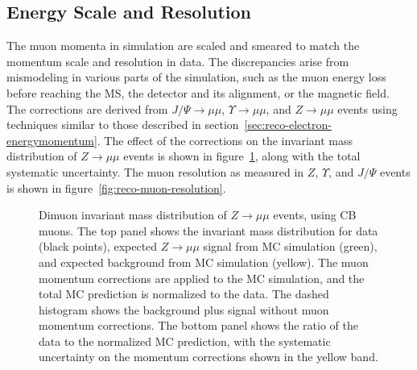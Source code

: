 \subsection{Energy Scale and Resolution}\label{sec:reco-muon-energymomentum}
The muon momenta in simulation are scaled and smeared to match the momentum scale and resolution in data. The discrepancies arise from mismodeling in various parts of the simulation, such as the muon energy loss before reaching the MS, the detector and its alignment, or the magnetic field. The corrections are derived from $J/\Psi\rightarrow\mu\mu$, $\Upsilon\rightarrow\mu\mu$, and $Z\rightarrow\mu\mu$ events using techniques similar to those described in section~\ref{sec:reco-electron-energymomentum}. The effect of the corrections on the invariant mass distribution of $Z\rightarrow\mu\mu$ events is shown in figure~\ref{fig:reco-muon-momentum-corrections}, along with the total systematic uncertainty. The muon resolution as measured in $Z$, $\Upsilon$, and $J/\Psi$ events is shown in figure~\ref{fig:reco-muon-resolution}.

\begin{figure}[htbp]
	\centering
	\caption{Dimuon invariant mass distribution of $Z\rightarrow\mu\mu$ events, using CB muons. The top panel shows the invariant mass distribution for data (black points), expected $Z\rightarrow\mu\mu$ signal from MC simulation (green), and expected background from MC simulation (yellow). The muon momentum corrections are applied to the MC simulation, and the total MC prediction is normalized to the data. The dashed histogram shows the background plus signal without muon momentum corrections. The bottom panel shows the ratio of the data to the normalized MC prediction, with the systematic uncertainty on the momentum corrections shown in the yellow band.}
	\label{fig:reco-muon-momentum-corrections}
\end{figure}


